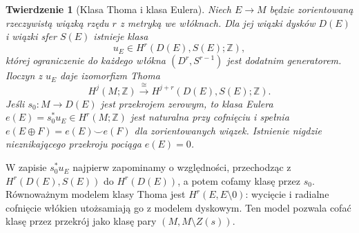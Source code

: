 \documentclass[11pt,a4paper,oneside]{report}
\newcommand{\Z}{\mathbb{Z}}
\theoremstyle{plain}
\newtheorem{twierdzenie}{Twierdzenie}[section]
\theoremstyle{definition}
\theoremstyle{remark}
\begin{document}
\begin{twierdzenie}[Klasa Thoma i klasa Eulera]
\label{thm:euler-thom-16}
Niech $E\to M$ będzie
zorientowaną rzeczywistą
wiązką rzędu $r$ z metryką
we włóknach. Dla jej
wiązki dysków $D(E)$
i wiązki sfer $S(E)$
istnieje klasa
\[
 u_E\in H^r(D(E),S(E);\Z),
\]
której ograniczenie do
każdego włókna
$(D^r,S^{r-1})$ jest
dodatnim generatorem.
Iloczyn z $u_E$ daje
izomorfizm Thoma
\[
 H^j(M;\Z)\stackrel{\cong}{\longrightarrow}
 H^{j+r}(D(E),S(E);\Z).
\]
Jeśli $s_0:M\to D(E)$
jest przekrojem zerowym,
to \emph{klasa Eulera}
$e(E)=s_0^*u_E\in H^r(M;\Z)$
jest naturalna przy
cofnięciu i spełnia
$e(E\oplus F)=e(E)\smile e(F)$
dla zorientowanych wiązek.
Istnienie nigdzie nieznikającego
przekroju pociąga $e(E)=0$.
\end{twierdzenie}

W zapisie $s_0^*u_E$ najpierw zapominamy o względności,
przechodząc z $H^r(D(E),S(E))$ do $H^r(D(E))$,
a potem cofamy klasę przez $s_0$. Równoważnym modelem
klasy Thoma jest $H^r(E,E\setminus0)$: wycięcie
i radialne cofnięcie włókien utożsamiają go z modelem
dyskowym. Ten model pozwala cofać klasę przez przekrój
jako klasę pary $(M,M\setminus Z(s))$.
\end{document}
